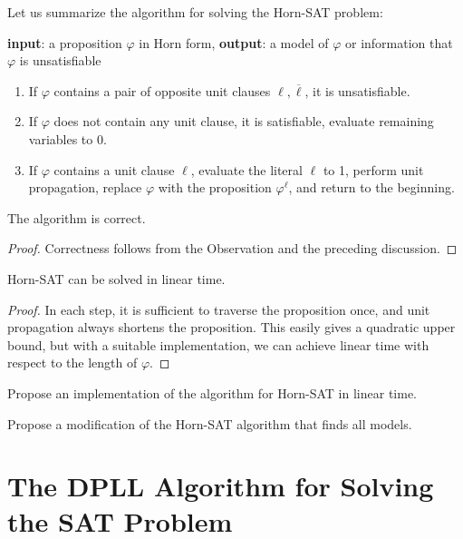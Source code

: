 Let us summarize the algorithm for solving the Horn-SAT problem:

\begin{algorithm}
\textbf{input}: a proposition $\varphi$ in Horn form, \textbf{output}: a model of $\varphi$ or information that $\varphi$ is unsatisfiable
\begin{enumerate}
    \item If $\varphi$ contains a pair of opposite unit clauses $\ell,\overline{\ell}$, it is unsatisfiable.
    \item If $\varphi$ does not contain any unit clause, it is satisfiable, evaluate remaining variables to 0.
    \item If $\varphi$ contains a unit clause $\ell$, evaluate the literal $\ell$ to 1, perform unit propagation, replace $\varphi$ with the proposition $\varphi^\ell$, and return to the beginning.
\end{enumerate}
\end{algorithm}

\begin{proposition}
The algorithm is correct.
\end{proposition}
\begin{proof}
Correctness follows from the Observation and the preceding discussion.
\end{proof}

\begin{corollary}
Horn-SAT can be solved in linear time.
\end{corollary}

\begin{proof}
In each step, it is sufficient to traverse the proposition once, and unit propagation always shortens the proposition. This easily gives a quadratic upper bound, but with a suitable implementation, we can achieve linear time with respect to the length of $\varphi$.
\end{proof}

\begin{exercise}
Propose an implementation of the algorithm for Horn-SAT in linear time.
\end{exercise}

\begin{exercise}
Propose a modification of the Horn-SAT algorithm that finds all models.
\end{exercise}


\section{The DPLL Algorithm for Solving the SAT Problem}\label{section:DPLL}


